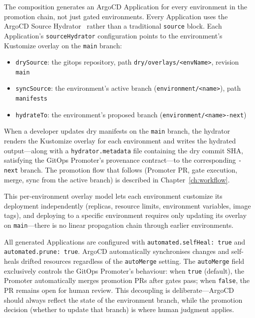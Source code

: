 The composition generates an ArgoCD Application for every environment in the promotion chain, not just gated environments. Every Application uses the ArgoCD Source Hydrator~\cite{argocd-hydrator} rather than a traditional \texttt{source} block. Each Application's \texttt{sourceHydrator} configuration points to the environment's Kustomize overlay on the \texttt{main} branch:

\begin{itemize}
    \item \texttt{drySource}: the gitops repository, path \texttt{dry/overlays/<envName>}, revision \texttt{main}
    \item \texttt{syncSource}: the environment's active branch (\texttt{environment/<name>}), path \texttt{manifests}
    \item \texttt{hydrateTo}: the environment's proposed branch (\texttt{environment/\allowbreak <name>-next})
\end{itemize}

When a developer updates dry manifests on the \texttt{main} branch, the hydrator renders the Kustomize overlay for each environment and writes the hydrated output---along with a \texttt{hydrator.metadata} file containing the dry commit SHA, satisfying the GitOps Promoter's provenance contract---to the corresponding \texttt{-next} branch. The promotion flow that follows (Promoter PR, gate execution, merge, sync from the active branch) is described in Chapter~\ref{ch:workflow}.

This per-environment overlay model lets each environment customize its deployment independently (replicas, resource limits, environment variables, image tags), and deploying to a specific environment requires only updating its overlay on \texttt{main}---there is no linear propagation chain through earlier environments.

All generated Applications are configured with \texttt{automated.selfHeal: true} and \texttt{automated.prune: true}. ArgoCD automatically synchronises changes and self-heals drifted resources regardless of the \texttt{autoMerge} setting. The \texttt{autoMerge} field exclusively controls the GitOps Promoter's behaviour: when \texttt{true} (default), the Promoter automatically merges promotion PRs after gates pass; when \texttt{false}, the PR remains open for human review. This decoupling is deliberate---ArgoCD should always reflect the state of the environment branch, while the promotion decision (whether to update that branch) is where human judgment applies.

